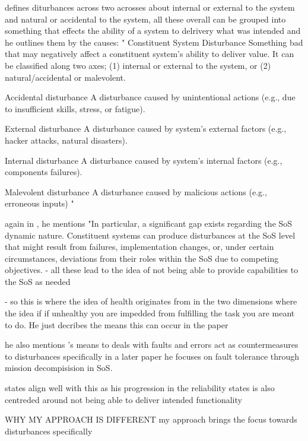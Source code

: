 \cite{ferreira2023towards} defines diturbances across two acrosses about internal or external to the system and natural or accidental to the system, all these overall can be grouped into something that effects the ability of a system to delrivery what was intended and he outlines them by the causes:
"
Constituent System Disturbance Something bad that may negatively affect a constituent system’s ability to deliver value. It can be
classified along two axes; (1) internal or external to the system, or (2) natural/accidental or
malevolent.

Accidental disturbance A disturbance caused by unintentional actions (e.g., due to insufficient skills, stress, or fatigue). 

External disturbance A disturbance caused by system’s external factors (e.g., hacker attacks, natural disasters).

Internal disturbance A disturbance caused by system’s internal factors (e.g., components failures).

Malevolent disturbance A disturbance caused by malicious actions (e.g., erroneous inputs)
"


again in \cite{ferreira2024framework}, he mentions "In particular, a significant gap exists regarding the SoS dynamic nature. Constituent systems can produce disturbances at the SoS level that might result from failures, implementation changes, or, under certain circumstances, deviations from their roles within the SoS due to competing objectives. - all these lead to the idea of not being able to provide capabilities to the SoS as needed


- so this is where the idea of health originates from in the two dimensions where the idea if if unhealthy you are impedded from fulfilling the task you are meant to do. He just decribes the means this can occur in the paper

he also mentions \cite{avizienis2004basic}'s means to deals with faults and errors act as countermeasures to disturbances specifically in a later paper \cite{ferreira2024framework} he focuses on fault tolerance through mission decompisision in SoS. 

\cite{parhami1994multi-level} states align well with this as his progression in the reliability states is also centreded around not being able to deliver intended functionality



WHY MY APPROACH IS DIFFERENT
my approach brings the focus towards disturbances specifically 

